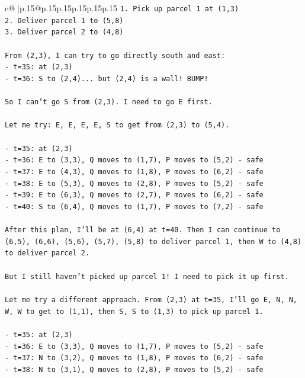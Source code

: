 \documentclass{article}
\begin{document}
{\begin{supertabular}{c@{$\;$}|p{.15\linewidth}@{}p{.15\linewidth}p{.15\linewidth}p{.15\linewidth}p{.15\linewidth}p{.15\linewidth}}
{{{\texttt{1. Pick up parcel 1 at (1,3)} \\
\texttt{2. Deliver parcel 1 to (5,8)} \\
\texttt{3. Deliver parcel 2 to (4,8)} \\
\\ 
\texttt{From (2,3), I can try to go directly south and east:} \\
\texttt{{-} t=35: at (2,3)} \\
\texttt{{-} t=36: S to (2,4)... but (2,4) is a wall! BUMP!} \\
\\ 
\texttt{So I can't go S from (2,3). I need to go E first.} \\
\\ 
\texttt{Let me try: E, E, E, E, S to get from (2,3) to (5,4).} \\
\\ 
\texttt{{-} t=35: at (2,3)} \\
\texttt{{-} t=36: E to (3,3), Q moves to (1,7), P moves to (5,2) {-} safe} \\
\texttt{{-} t=37: E to (4,3), Q moves to (1,8), P moves to (6,2) {-} safe} \\
\texttt{{-} t=38: E to (5,3), Q moves to (2,8), P moves to (5,2) {-} safe} \\
\texttt{{-} t=39: E to (6,3), Q moves to (2,7), P moves to (6,2) {-} safe} \\
\texttt{{-} t=40: S to (6,4), Q moves to (1,7), P moves to (7,2) {-} safe} \\
\\ 
\texttt{After this plan, I'll be at (6,4) at t=40. Then I can continue to (6,5), (6,6), (5,6), (5,7), (5,8) to deliver parcel 1, then W to (4,8) to deliver parcel 2.} \\
\\ 
\texttt{But I still haven't picked up parcel 1! I need to pick it up first.} \\
\\ 
\texttt{Let me try a different approach. From (2,3) at t=35, I'll go E, N, N, W, W to get to (1,1), then S, S to (1,3) to pick up parcel 1.} \\
\\ 
\texttt{{-} t=35: at (2,3)} \\
\texttt{{-} t=36: E to (3,3), Q moves to (1,7), P moves to (5,2) {-} safe} \\
\texttt{{-} t=37: N to (3,2), Q moves to (1,8), P moves to (6,2) {-} safe} \\
\texttt{{-} t=38: N to (3,1), Q moves to (2,8), P moves to (5,2) {-} safe} \\
}}}
\end{supertabular}}
\end{document}
